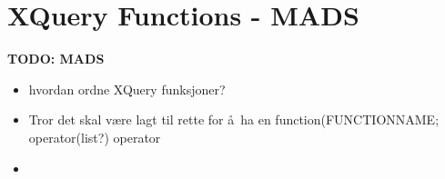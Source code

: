 \section{XQuery Functions - {MADS}}
\label{sect:disc:functions}
\textbf{\LARGE TODO: {MADS}}
\begin{itemize}
  \item hvordan ordne XQuery funksjoner?
  \item Tror det skal v\ae re lagt til rette for \aa~ha en \textsf{function(FUNCTIONNAME; operator(list?)} operator
  \item 
\end{itemize}